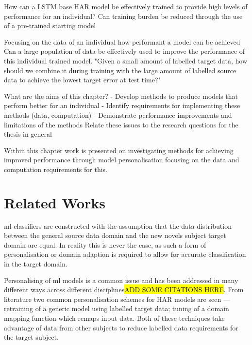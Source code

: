How can a LSTM base HAR model be effectively trained to provide high levels of performance for an individual?
Can training burden be reduced through the use of a pre-trained starting model

Focusing on the data of an individual how performant a model can be achieved
Can a large population of data be effectively used to improve the performance of this individual trained model. "Given a small amount of labelled target data, how should we combine it during training with the large amount of labelled source data to achieve the lowest target error at test time?"

What are the aims of this chapter?
- Develop methods to produce models that perform better for an individual 
- Identify requirements for implementing these methods (data, computation)
- Demonstrate performance improvements and limitations of the methods
Relate these issues to the research questions for the thesis in general


Within this chapter work is presented on investigating methods for achieving improved performance through model personalisation focusing on the data and computation requirements for this.



\section{Related Works}
\acrshort{ml} classifiers are constructed with the assumption that the data distribution between the general source data domain and the new novels subject target domain are equal\cite{Farahani2020}. In reality this is never the case, as such a form of personalisation or domain adaption is required to allow for accurate classification in the target domain.

Personalising of \acrshort{ml} models is a common issue and has been addressed in many different ways across different disciplines\hl{ADD SOME CITATIONS HERE}. From literature two common personalisation schemes for HAR models are seen --- retraining of a generic model using labelled target data; tuning of a domain mapping function which remaps input data. Both of these techniques take advantage of data from other subjects to reduce labelled data requirements for the target subject\cite{Shor2020}.


